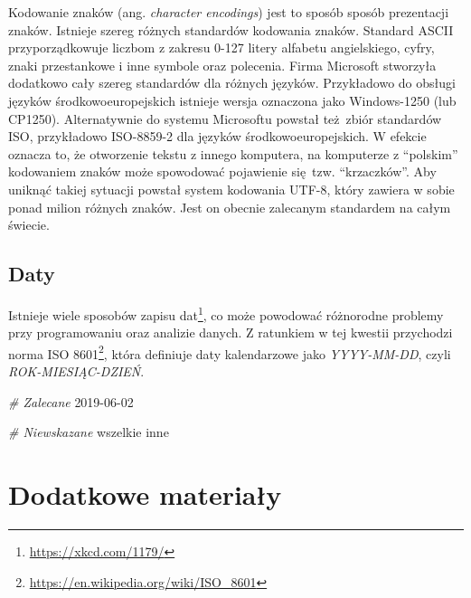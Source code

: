 \documentclass[paper=6in:9in,pagesize=pdftex,headinclude=on,footinclude=on,10pt]{scrbook}
\makeatletter
\newenvironment{Shaded}{\begin{snugshade}}{\end{snugshade}}
\newcommand{\CommentTok}[1]{\textcolor[rgb]{0.56,0.35,0.01}{\textit{#1}}}
\newcommand{\DecValTok}[1]{\textcolor[rgb]{0.00,0.00,0.81}{#1}}
\newcommand{\NormalTok}[1]{#1}
\DeclareRobustCommand{\href}[2]{#2\footnote{\url{#1}}}
\newenvironment{kframe}{%
\medskip{}
\setlength{\fboxsep}{.8em}
 \def\at@end@of@kframe{}%
 \ifinner\ifhmode%
  \def\at@end@of@kframe{\end{minipage}}%
  \begin{minipage}{\columnwidth}%
 \fi\fi%
 \def\FrameCommand##1{\hskip\@totalleftmargin \hskip-\fboxsep
 \colorbox{shadecolor}{##1}\hskip-\fboxsep
     \hskip-\linewidth \hskip-\@totalleftmargin \hskip\columnwidth}%
 \MakeFramed {\advance\hsize-\width
   \@totalleftmargin\z@ \linewidth\hsize
   \@setminipage}}%
 {\par\unskip\endMakeFramed%
 \at@end@of@kframe}
\newenvironment{rmdblock}[1]
  {
  \begin{itemize}
  \renewcommand{\labelitemi}{
    \raisebox{-.7\height}[0pt][0pt]{
      {\setkeys{Gin}{width=3em,keepaspectratio}\texttt{[image: images/\#1]}}
    }
  }
  \setlength{\fboxsep}{1em}
  \begin{kframe}
  \item
  }
  {
  \end{kframe}
  \end{itemize}
  }
\newenvironment{rmdinfo}
  {\begin{rmdblock}{compass}}
  {\end{rmdblock}}
\makeatother
\begin{document}
\begin{rmdinfo}
\begin{rmdinfo}

Kodowanie znaków (ang. \emph{character encodings}) jest to sposób sposób prezentacji znaków.
Istnieje szereg różnych standardów kodowania znaków.
Standard ASCII przyporządkowuje liczbom z zakresu 0-127 litery alfabetu angielskiego, cyfry, znaki przestankowe i inne symbole oraz polecenia.
Firma Microsoft stworzyła dodatkowo cały szereg standardów dla różnych języków.
Przykładowo do obsługi języków środkowoeuropejskich istnieje wersja oznaczona jako Windows-1250 (lub CP1250).
Alternatywnie do systemu Microsoftu powstał też~zbiór standardów ISO, przykładowo ISO-8859-2 dla języków środkowoeuropejskich.
W efekcie oznacza to, że otworzenie tekstu z innego komputera, na komputerze z ``polskim'' kodowaniem znaków może spowodować pojawienie się~tzw. ``krzaczków''.
Aby uniknąć takiej sytuacji powstał system kodowania UTF-8, który zawiera w sobie ponad milion różnych znaków.
Jest on obecnie zalecanym standardem na całym świecie.

\end{rmdinfo}
\end{rmdinfo}

\hypertarget{daty}{%
\subsection{Daty}\label{daty}}

Istnieje wiele sposobów zapisu dat\footnote{\url{https://xkcd.com/1179/}}, co może powodować różnorodne problemy przy programowaniu oraz analizie danych.
Z ratunkiem w tej kwestii przychodzi norma \href{https://en.wikipedia.org/wiki/ISO_8601}{ISO 8601}, która definiuje daty kalendarzowe jako \emph{YYYY-MM-DD}, czyli \emph{ROK-MIESIĄC-DZIEŃ}.

\begin{Shaded}
\begin{Highlighting}[]
\CommentTok{# Zalecane}
\DecValTok{2019-06-02}

\CommentTok{# Niewskazane}
\NormalTok{wszelkie inne}
\end{Highlighting}
\end{Shaded}

\hypertarget{resources}{%
\section{Dodatkowe materiały}\label{resources}}
\end{document}
